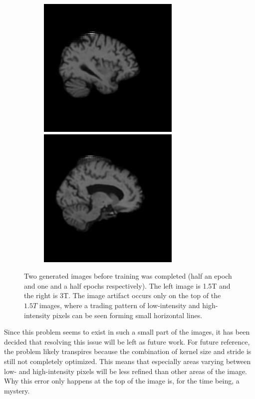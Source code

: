 \documentclass[12pt, fleqn, titlepage]{article}
\begin{document}
\begin{figure}[H]
	\centering
	\begin{subfigure}[b]{0.7\textwidth}
		\centering
		\includegraphics[width=0.475\linewidth]{imgs/1.5T_hori1}%
		\hfill
		\includegraphics[width=0.475\linewidth]{imgs/1.5T_hori2}
	\end{subfigure}
	\caption{Two generated images before training was completed (half an epoch and one and a half epochs respectively). The left image is 1.5T and the right is 3T. The image artifact occurs only on the top of the $1.5T$ images, where a trading pattern of low-intensity and high-intensity pixels can be seen forming small horizontal lines.}
	\label{fig:troubleshoot_horizontals}
\end{figure}
Since this problem seems to exist in such a small part of the images, it has been decided that resolving this issue will be left as future work. For future reference, the problem likely transpires because the combination of kernel size and stride is still not completely optimized. This means that especially areas varying between low- and high-intensity pixels will be less refined than other areas of the image. Why this error only happens at the top of the image is, for the time being, a mystery.
\\\\
\end{document}
